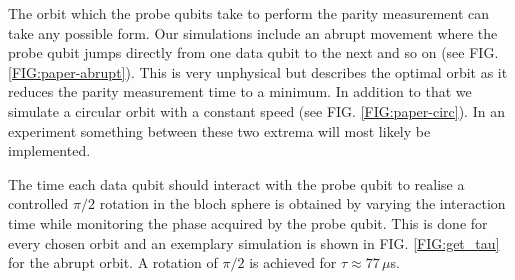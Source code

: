 \begin{figure}[H]
	\caption[oddeven]{}
	\label{FIG:evolution}
\end{figure}


The orbit which the probe qubits take to perform the parity measurement can take any possible form. Our simulations include an abrupt movement where the probe qubit jumps directly from one data qubit to the next and so on (see FIG. \ref{FIG:paper-abrupt}). This is very unphysical but describes the optimal orbit as it reduces the parity measurement time to a minimum. In addition to that we simulate a circular orbit with a constant speed (see FIG. \ref{FIG:paper-circ}). In an experiment something between these two extrema will most likely be implemented. 

The time each data qubit should interact with the probe qubit to realise a controlled $\pi/2$ rotation in the bloch sphere is obtained by varying the interaction time while monitoring the phase acquired by the probe qubit. This is done for every chosen orbit and an exemplary simulation is shown in FIG. \ref{FIG:get_tau} for the abrupt orbit. A rotation of $\pi/2$ is achieved for $\tau\approx 77\, \mu$s.

